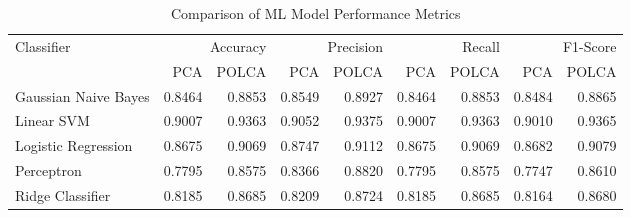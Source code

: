 \begin{table}[htbp]
\caption{Comparison of ML Model Performance Metrics}
\label{tab:model_comparison}
\begin{tabular}{lrrrrrrrr}
\toprule
Classifier & \multicolumn{2}{r}{Accuracy} & \multicolumn{2}{r}{Precision} & \multicolumn{2}{r}{Recall} & \multicolumn{2}{r}{F1-Score} \\
 & PCA & POLCA & PCA & POLCA & PCA & POLCA & PCA & POLCA \\
\midrule
Gaussian Naive Bayes & 0.8464 & 0.8853 & 0.8549 & 0.8927 & 0.8464 & 0.8853 & 0.8484 & 0.8865 \\
Linear SVM & 0.9007 & 0.9363 & 0.9052 & 0.9375 & 0.9007 & 0.9363 & 0.9010 & 0.9365 \\
Logistic Regression & 0.8675 & 0.9069 & 0.8747 & 0.9112 & 0.8675 & 0.9069 & 0.8682 & 0.9079 \\
Perceptron & 0.7795 & 0.8575 & 0.8366 & 0.8820 & 0.7795 & 0.8575 & 0.7747 & 0.8610 \\
Ridge Classifier & 0.8185 & 0.8685 & 0.8209 & 0.8724 & 0.8185 & 0.8685 & 0.8164 & 0.8680 \\
\bottomrule
\end{tabular}
\end{table}
